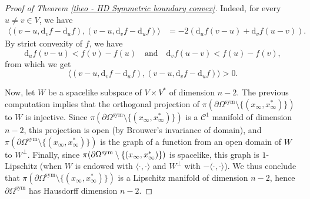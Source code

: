 \documentclass[10pt,a4paper]{amsart}
\newcommand{\quand}{\quad\text{and}\quad}
\newcommand{\sym}{\mathrm{sym}}
\theoremstyle{definition}
\begin{document}
\begin{proof}[Proof of Theorem \ref{theo - HD Symmetric boundary convex}]
Indeed, for every $u\neq v \in V$, we have
\begin{align*}
\bigl\langle (v-u, \mathrm d_v f - \mathrm d_u f), (v-u, \mathrm d_v f - \mathrm d_u f)\bigr\rangle &= -2(\mathrm d_u f(v-u) + \mathrm d_v f(u-v)).
\end{align*}
By strict convexity of $f$, we have
\[\mathrm d_u f(v-u) < f(v) - f(u)\quand \mathrm d_v f(u-v) < f(u) - f(v),\]
from which we get
\[\bigl\langle (v-u, \mathrm d_v f - \mathrm d_u f), (v-u, \mathrm d_v f - \mathrm d_u f)\bigr\rangle > 0.\]

Now, let $W$ be a spacelike subspace of $V\times V^*$ of dimension $n-2$. The previous computation implies that the orthogonal projection of $\pi(\partial \Omega^{\sym} \setminus \{(x_\infty, x_\infty^*)\})$ to $W$ is injective. Since $\pi(\partial \Omega^{\sym} \setminus \{(x_\infty, x_\infty^*)\})$ is a $\mathcal C^1$ manifold of dimension $n-2$, this projection is open (by Brouwer's invariance of domain), and $\pi(\partial \Omega^{\sym} \setminus \{(x_\infty, x_\infty^*)\})$ is the graph of a function from an open domain of $W$ to $W^\perp$. Finally, since $\pi(\partial \Omega^{\sym} \setminus\nobreak \{(x_\infty, x_\infty^*)\})$ is spacelike, this graph is $1$-Lipschitz (when $W$ is endowed with $\langle \cdot , \cdot \rangle$ and $W^\perp$ with $-\langle \cdot , \cdot \rangle$). We thus conclude that $\pi(\partial \Omega^{\sym} \setminus \{(x_\infty, x_\infty^*)\})$ is a Lipschitz manifold of dimension $n-2$, hence $\partial \Omega^{\sym}$ has Hausdorff dimension $n-2$.
\end{proof}
\end{document}
